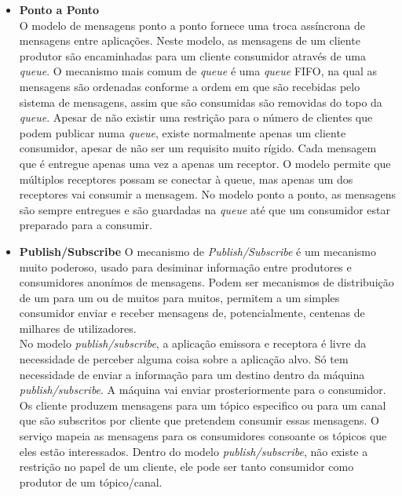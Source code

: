 \begin{itemize}
\item \textbf{Ponto a Ponto}\\
O modelo de mensagens ponto a ponto fornece uma troca assíncrona de mensagens entre aplicações. Neste modelo, as mensagens de um cliente produtor são encaminhadas para um cliente consumidor através de uma \textit{queue}. O mecanismo mais comum de \textit{queue} é uma \textit{queue} FIFO, na qual as mensagens são ordenadas conforme a ordem em que são recebidas pelo sistema de mensagens, assim que são consumidas são removidas do topo da \textit{queue}. 
Apesar de não existir uma restrição para o número de clientes que podem publicar numa \textit{queue}, existe normalmente apenas um cliente consumidor, apesar de não ser um requisito muito rígido. Cada mensagem que é entregue apenas uma vez a apenas um receptor. O modelo permite que múltiplos receptores possam se conectar à queue, mas apenas um dos receptores vai consumir a mensagem. No modelo ponto a ponto, as mensagens são sempre entregues e são guardadas na \textit{queue} até que um consumidor estar preparado para a consumir.  
\item \textbf{Publish/Subscribe}
O mecanismo  de \textit{Publish/Subscribe} é um mecanismo muito poderoso, usado para desiminar informação entre produtores e consumidores anonímos de mensagens. Podem ser mecanismos de distribuição de um para um ou de muitos para muitos, permitem a um simples consumidor enviar e receber mensagens de, potencialmente, centenas de milhares de utilizadores.\\
No modelo \textit{publish/subscribe}, a aplicação emissora e receptora é livre da necessidade de perceber alguma coisa sobre a aplicação alvo.  Só tem necessidade de enviar a informação para um destino dentro da máquina \textit{publish/subscribe}. A máquina vai enviar prosteriormente para o consumidor. Os cliente produzem mensagens para um tópico especifico ou para um canal que são subscritos por cliente que pretendem consumir essas mensagens. O serviço mapeia as mensagens para os consumidores consoante os tópicos que eles estão interessados. Dentro do modelo \textit{publish/subscribe}, não existe a restrição no papel de um cliente, ele pode ser tanto consumidor como produtor de um tópico/canal.\\
\end{itemize}
